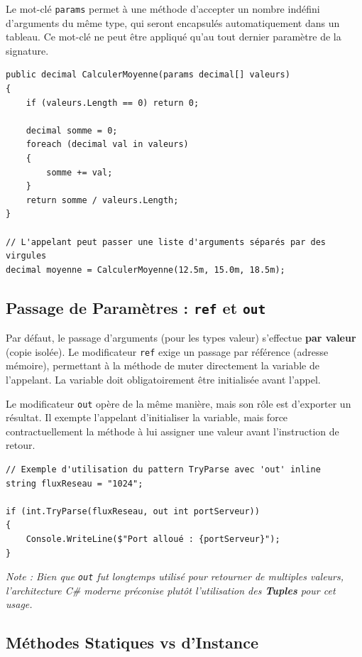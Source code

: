 Le mot-clé \texttt{params} permet à une méthode d'accepter un nombre indéfini d'arguments du même type, qui seront encapsulés automatiquement dans un tableau. Ce mot-clé ne peut être appliqué qu'au tout dernier paramètre de la signature.

\begin{lstlisting}[style=csharpstyle]
public decimal CalculerMoyenne(params decimal[] valeurs)
{
    if (valeurs.Length == 0) return 0;
    
    decimal somme = 0;
    foreach (decimal val in valeurs)
    {
        somme += val;
    }
    return somme / valeurs.Length;
}

// L'appelant peut passer une liste d'arguments séparés par des virgules
decimal moyenne = CalculerMoyenne(12.5m, 15.0m, 18.5m);
\end{lstlisting}

\subsection{Passage de Paramètres : \texttt{ref} et \texttt{out}}

Par défaut, le passage d'arguments (pour les types valeur) s'effectue \textbf{par valeur} (copie isolée). Le modificateur \texttt{ref} exige un passage par référence (adresse mémoire), permettant à la méthode de muter directement la variable de l'appelant. La variable doit obligatoirement être initialisée avant l'appel.

Le modificateur \texttt{out} opère de la même manière, mais son rôle est d'exporter un résultat. Il exempte l'appelant d'initialiser la variable, mais force contractuellement la méthode à lui assigner une valeur avant l'instruction de retour.

\begin{lstlisting}[style=csharpstyle]
// Exemple d'utilisation du pattern TryParse avec 'out' inline
string fluxReseau = "1024";

if (int.TryParse(fluxReseau, out int portServeur))
{
    Console.WriteLine($"Port alloué : {portServeur}");
}
\end{lstlisting}
\textit{Note : Bien que \texttt{out} fut longtemps utilisé pour retourner de multiples valeurs, l'architecture C\# moderne préconise plutôt l'utilisation des \textbf{Tuples} pour cet usage.}

\subsection{Méthodes Statiques vs d'Instance}

